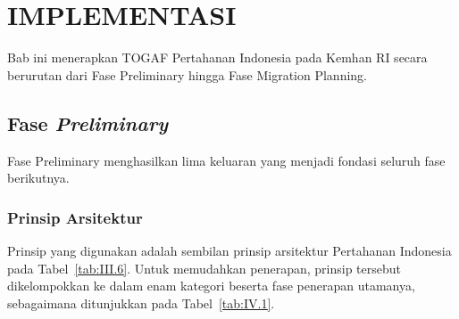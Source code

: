 \cleardoublepage
\chapter{IMPLEMENTASI}
\label{chap:IV}

Bab ini menerapkan TOGAF Pertahanan Indonesia pada Kemhan RI secara berurutan dari Fase Preliminary hingga Fase Migration Planning.

\section{Fase \textit{Preliminary}}
\label{sec:IV.1}

Fase Preliminary menghasilkan lima keluaran yang menjadi fondasi seluruh fase berikutnya.

\subsection{Prinsip Arsitektur}
\label{sec:IV.1.1}

Prinsip yang digunakan adalah sembilan prinsip arsitektur Pertahanan Indonesia pada Tabel~\ref{tab:III.6}. Untuk memudahkan penerapan, prinsip tersebut dikelompokkan ke dalam enam kategori beserta fase penerapan utamanya, sebagaimana ditunjukkan pada Tabel~\ref{tab:IV.1}.

